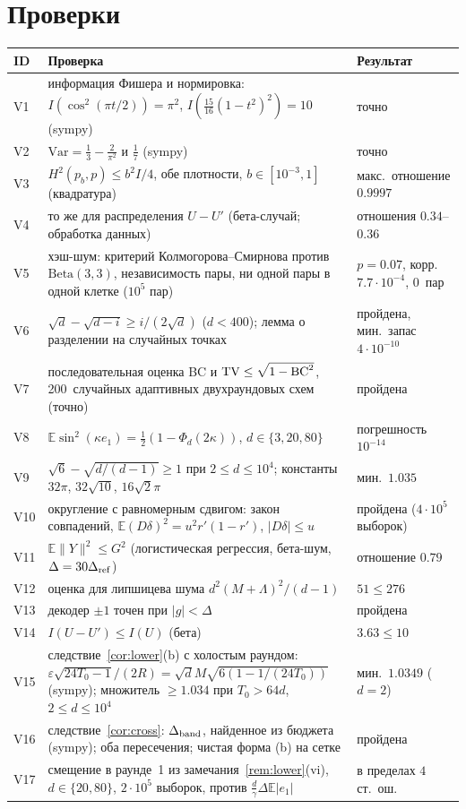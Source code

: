 \documentclass[11pt,a4paper]{article}
\numberwithin{equation}{section}
\theoremstyle{definition}
\theoremstyle{remark}
\newcommand{\E}{\mathbb E}\newcommand{\R}{\mathbb R}\newcommand{\Z}{\mathbb Z}\let\Prob\relax\newcommand{\Prob}{\mathbb P}
\newcommand{\norm}[1]{\lVert #1\rVert}\newcommand{\abs}[1]{\lvert #1\rvert}\newcommand{\ip}[2]{\langle #1,#2\rangle}
\begin{document}
\appendix
\section{Проверки}\label{app:checks}
\begin{center}\small
\begin{tabularx}{\textwidth}{@{}lXl@{}}
\toprule
ID & Проверка & Результат\\
\midrule
V1 & информация Фишера и нормировка: $I(\cos^2(\pi t/2))=\pi^2$, $I(\frac{15}{16}(1-t^2)^2)=10$ (sympy) & точно\\
V2 & $\mathrm{Var}=\frac13-\frac2{\pi^2}$ и $\frac17$ (sympy) & точно\\
V3 & $H^2(p_b,p)\le b^2I/4$, обе плотности, $b\in[10^{-3},1]$ (квадратура) & макс.\ отношение $0.9997$\\
V4 & то же для распределения $U-U'$ (бета-случай; обработка данных) & отношения $0.34$--$0.36$\\
V5 & хэш-шум: критерий Колмогорова--Смирнова против $\mathrm{Beta}(3,3)$, независимость пары, ни одной пары в одной клетке ($10^5$ пар) & $p=0.07$, корр.\ $7.7\cdot10^{-4}$, 0~пар\\
V6 & $\sqrt d-\sqrt{d-i}\ge i/(2\sqrt d)$ ($d<400$); лемма о разделении на случайных точках & пройдена, мин.\ запас $4\cdot10^{-10}$\\
V7 & последовательная оценка BC и $\mathrm{TV}\le\sqrt{1-\mathrm{BC}^2}$, 200~случайных адаптивных двухраундовых схем (точно) & пройдена\\
V8 & $\E\sin^2(\kappa e_1)=\frac12(1-\Phi_d(2\kappa))$, $d\in\{3,20,80\}$ & погрешность $10^{-14}$\\
V9 & $\sqrt6-\sqrt{d/(d-1)}\ge1$ при $2\le d\le10^4$; константы $32\pi$, $32\sqrt{10}$, $16\sqrt2\pi$ & мин.\ $1.035$\\
V10 & округление с равномерным сдвигом: закон совпадений, $\E(D\delta)^2=u^2r'(1-r')$, $\abs{D\delta}\le u$ & пройдена ($4\cdot10^5$ выборок)\\
V11 & $\E\norm Y^2\le G^2$ (логистическая регрессия, бета-шум, $\Delta=30\Delta_{\rm ref}$) & отношение $0.79$\\
V12 & оценка для липшицева шума $d^2(M+\Lambda)^2/(d-1)$ & $51\le276$\\
V13 & декодер $\pm1$ точен при $\abs g<\Delta$ & пройдена\\
V14 & $I(U-U')\le I(U)$ (бета) & $3.63\le10$\\
V15 & следствие~\ref{cor:lower}(b) с холостым раундом: $\varepsilon\sqrt{24T_0-1}/(2R)=\sqrt dM\sqrt{6(1-1/(24T_0))}$ (sympy); множитель $\ge1.034$ при $T_0>64d$, $2\le d\le10^4$ & мин.\ $1.0349$ ($d=2$)\\
V16 & следствие~\ref{cor:cross}: $\Delta_{\rm band}$, найденное из бюджета (sympy); оба пересечения; чистая форма (b) на сетке & пройдена\\
V17 & смещение в раунде~1 из замечания~\ref{rem:lower}(vi), $d\in\{20,80\}$, $2\cdot10^5$ выборок, против $\frac d\gamma\Delta\E\abs{e_1}$ & в пределах $4$ ст.\ ош.\\
\bottomrule
\end{tabularx}
\end{center}
\end{document}
